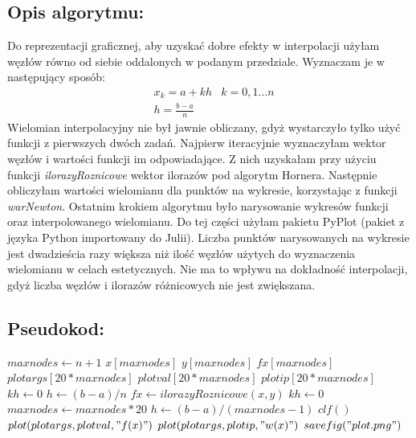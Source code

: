\documentclass{article}
\begin{document}
\subsection{Opis algorytmu:}
Do reprezentacji graficznej, aby uzyskać dobre efekty w interpolacji użyłam
węzłów równo od siebie oddalonych w podanym przedziale. Wyznaczam je w następujący sposób:
$$
\begin{aligned}
    &x_k = a + kh  
    &k = 0, 1 \dots n\\
    &h = \frac{b-a}{n}
\end{aligned}
$$
\newline
Wielomian interpolacyjny nie był jawnie obliczany, gdyż wystarczyło 
tylko użyć funkcji z pierwszych dwóch zadań. Najpierw iteracyjnie wyznaczyłam 
wektor węzłów i wartości funkcji im odpowiadające. Z nich uzyskałam 
przy użyciu funkcji \textit{ilorazyRoznicowe} wektor ilorazów pod algorytm Hornera. 
Następnie obliczyłam wartości wielomianu dla punktów na wykresie, korzystając 
z funkcji \textit{warNewton}. 
\newline
\newline
Ostatnim krokiem algorytmu było narysowanie 
wykresów funkcji oraz interpolowanego wielomianu. Do tej części użyłam pakietu 
PyPlot (pakiet z języka Python importowany do Julii).
Liczba punktów narysowanych na wykresie jest 
dwadzieścia razy większa niż ilość węzłów użytych do wyznaczenia wielomianu 
w celach estetycznych. Nie ma to wpływu na dokładność interpolacji, gdyż 
liczba węzłów i ilorazów różnicowych nie jest zwiększana. 

\subsection{Pseudokod:}
\begin{algorithm}
    \DontPrintSemicolon
    \;
    $maxnodes \gets n+1$
    \;
    $x[maxnodes]$
    $y[maxnodes]$
    $fx[maxnodes]$
    \;
    $plotargs[20*maxnodes]$
    $plotval[20*maxnodes]$
    $plotip[20*maxnodes]$
    \;
    $kh \gets 0$
    $h \gets (b-a)/n$
    \;
    $fx \gets ilorazyRoznicowe(x,y)$\;
    $kh \gets 0$
    $maxnodes \gets maxnodes*20$
    $h \gets (b-a)/(maxnodes-1)$\;
    $clf()$\;
    $plot(plotargs,plotval,"f(x)")$\;
    $plot(plotargs,plotip,"w(x)")$\;
    $savefig("plot.png")$
\end{algorithm}
\end{document}
